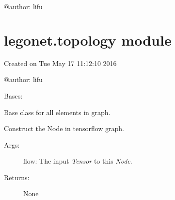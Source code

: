 \documentclass[letterpaper,10pt,english]{sphinxmanual}
\begin{document}
@author: lifu


\section{legonet.topology module}
\label{legonet:legonet-topology-module}\label{legonet:module-legonet.topology}
Created on Tue May 17 11:12:10 2016

@author: lifu

\begin{fulllineitems}
\label{legonet:legonet.topology.Node}
Bases: 

Base class for all elements in graph.

\begin{fulllineitems}
\label{legonet:legonet.topology.Node.call}
Construct the Node in tensorflow graph.
\begin{description}
\item[{Args:}] \leavevmode
flow: The input \emph{Tensor} to this \emph{Node}.

\item[{Returns:}] \leavevmode
None

\end{description}

\end{fulllineitems}


\end{fulllineitems}

\end{document}
